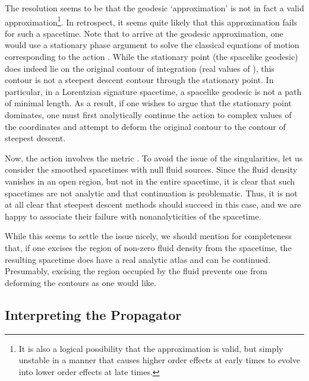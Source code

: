 \documentclass[a4paper,12pt]{article}
\begin{document}
The resolution seems to be that the geodesic `approximation' is not in
fact a valid approximation\footnote{It is also a logical possibility
  that the approximation is valid, but simply unstable in a manner
  that causes higher order effects at early times to evolve into lower
  order effects at late times.}.  In retrospect, it seems quite likely
that this approximation fails for such a spacetime.  Note that to
arrive at the geodesic approximation, one would use a stationary phase
argument to solve the classical equations of motion corresponding to
the action \coordHE{}.  While the stationary point
(the spacelike geodesic) does indeed lie on the original contour of
integration (real values of \coordHE{}), this contour is not a steepest
descent contour through the stationary point.  In particular, in a
Lorentzian signature spacetime, a spacelike geodesic is not a path of
minimal length.  As a result, if one wishes to argue that the
stationary point dominates, one must first analytically continue the
action to complex values of the coordinates and attempt to deform the
original contour to the contour of steepest descent.

Now, the action involves the metric \coordHE{}.  To avoid the issue
of the singularities, let us consider the smoothed spacetimes with
null fluid sources.  Since the fluid density vanishes in an open
region, but not in the entire spacetime, it is clear that such
spacetimes are not analytic and that continuation is problematic.
Thus, it is not at all clear that steepest descent methods should
succeed in this case, and we are happy to associate their failure with
nonanalyticities of the spacetime.

While this seems to settle the issue nicely, we should mention for
completeness that, if one excises the region of non-zero fluid density
from the spacetime, the resulting spacetime does have a real analytic
atlas and can be continued.  Presumably, excising the region occupied
by the fluid prevents one from deforming the contours as one would
like.

\subsection{Interpreting the Propagator}
\label{interp}
\end{document}
